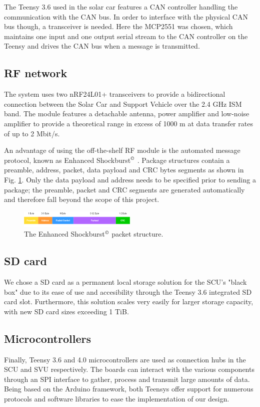 \documentclass[conference]{IEEEtran}
\begin{document}
The Teensy 3.6 used in the solar car features a CAN controller handling the communication with the CAN bus. In order to interface with the physical CAN bus though, a transceiver is needed. Here the MCP2551 was chosen, which maintains one input and one output serial stream to the CAN controller on the Teensy and drives the CAN bus when a message is transmitted.
\subsection{RF network} %
The system uses two nRF24L01+ transceivers to provide a bidirectional connection between the Solar Car and Support Vehicle over the 2.4 GHz ISM band. The module features a detachable antenna, power amplifier and low-noise amplifier to provide a theoretical range in excess of 1000 m at data transfer rates of up to 2 Mbit/s.

An advantage of using the off-the-shelf RF module is the automated message protocol, known as Enhanced Shockburst$^\copyright$ \cite{shockburst}. Package structures contain a preamble, address, packet, data payload and CRC bytes segments as shown in Fig. \ref{fig:shockburst}. Only the data payload and address needs to be specified prior to sending a package; the preamble, packet and CRC segments are generated automatically and therefore fall beyond the scope of this project. 

\begin{figure}[h]
    \centering
    \includegraphics[width=0.5\textwidth]{documentation/images/EnhancedShockburst.png}
    \caption{The Enhanced Shockburst$^\copyright$ packet structure.}
    \label{fig:shockburst}
\end{figure}

\subsection{SD card}

We chose a SD card as a permanent local storage solution for the SCU's "black box" due to its ease of use and accesibility through the Teensy 3.6 integrated SD card slot. Furthermore, this solution scales very easily for larger storage capacity, with new SD card sizes exceeding 1 TiB.

\subsection{Microcontrollers} %
Finally, Teensy 3.6 and 4.0 microcontrollers are used as connection hubs in the SCU and SVU respectively. The boards can interact with the various components through an SPI interface to gather, process and transmit large amounts of data. Being based on the Arduino framework, both Teensys offer support for numerous protocols and software libraries to ease the implementation of our design. 
\end{document}
